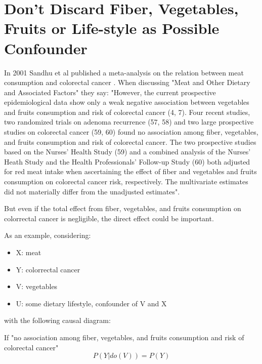 \documentclass{article}
\begin{document}
\section{Don't Discard Fiber, Vegetables, Fruits or Life-style as Possible Confounder}

In 2001 Sandhu et al published a meta-analysis on the relation between meat consumption and colorectal cancer \cite{sandhu}. When discussing "Meat and Other Dietary and Associated Factors" they say: "However, the current
prospective epidemiological data show only a weak negative
association between vegetables and fruits consumption and risk
of colorectal cancer (4, 7). Four recent studies, two randomized
trials on adenoma recurrence (57, 58) and two large prospective
studies on colorectal cancer (59, 60) found no association
among fiber, vegetables, and fruits consumption and risk of colorectal cancer. The two prospective studies based on the
Nurses’ Health Study (59) and a combined analysis of the
Nurses’ Heath Study and the Health Professionals’ Follow-up
Study (60) both adjusted for red meat intake when ascertaining
the effect of fiber and vegetables and fruits consumption on
colorectal cancer risk, respectively. The multivariate estimates
did not materially differ from the unadjusted estimates".

But even if the total effect from fiber, vegetables, and fruits consumption on colorrectal cancer is negligible, the direct effect could be important.

As an example, considering:

\begin{itemize}
\item X: meat
\item Y: colorrectal cancer
\item V: vegetables
\item U: some dietary lifestyle, confounder of V and X
\end{itemize}

with the following causal diagram:


If "no association among fiber, vegetables, and fruits consumption and risk of colorectal cancer"
\begin{equation}
  P(Y|do(V))=P(Y)
\end{equation}
\end{document}
